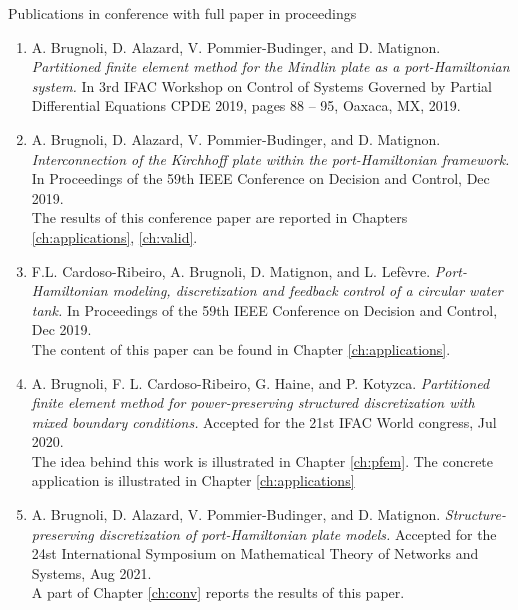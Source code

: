 Publications in conference with full paper in proceedings \cite{brugnoli2019cpde,brugnoli2019cdc,cardoso2019cdc,brugnoli2020wc,brugnoli2020mtns}
\begin{enumerate}
	\item A. Brugnoli, D. Alazard, V. Pommier-Budinger, and D. Matignon. \textit{Partitioned finite element method for the Mindlin plate as a port-Hamiltonian system.} In 3rd IFAC Workshop on Control of Systems Governed by Partial Differential Equations CPDE 2019, pages 88 – 95, Oaxaca, MX, 2019. 
	\item A. Brugnoli, D. Alazard, V. Pommier-Budinger, and D. Matignon. \textit{Interconnection of the Kirchhoff plate within the port-Hamiltonian framework.} In Proceedings of the 59th IEEE Conference on Decision and Control, Dec 2019. \\
	The results of this conference paper are reported in Chapters \ref{ch:applications}, \ref{ch:valid}.
	\item F.L. Cardoso-Ribeiro, A. Brugnoli, D. Matignon, and L. Lefèvre. \textit{Port-Hamiltonian modeling, discretization and feedback control of a circular water tank.} In Proceedings of the 59th IEEE Conference on Decision and Control, Dec 2019. \\
	The content of this paper can be found in Chapter \ref{ch:applications}.
	\item A. Brugnoli, F. L. Cardoso-Ribeiro, G. Haine, and P. Kotyzca. \textit{Partitioned finite element method for power-preserving structured discretization with mixed boundary conditions.} Accepted for the 21st IFAC World congress, Jul 2020. \\
	The idea behind this work is illustrated in Chapter \ref{ch:pfem}. The concrete application is illustrated in Chapter \ref{ch:applications}
	\item A. Brugnoli, D. Alazard, V. Pommier-Budinger, and D. Matignon. \textit{Structure-preserving discretization of port-Hamiltonian plate models.} Accepted for the 24st International Symposium on Mathematical Theory of Networks and Systems, Aug 2021. \\
	A part of Chapter \ref{ch:conv} reports the results of this paper.
\end{enumerate}




